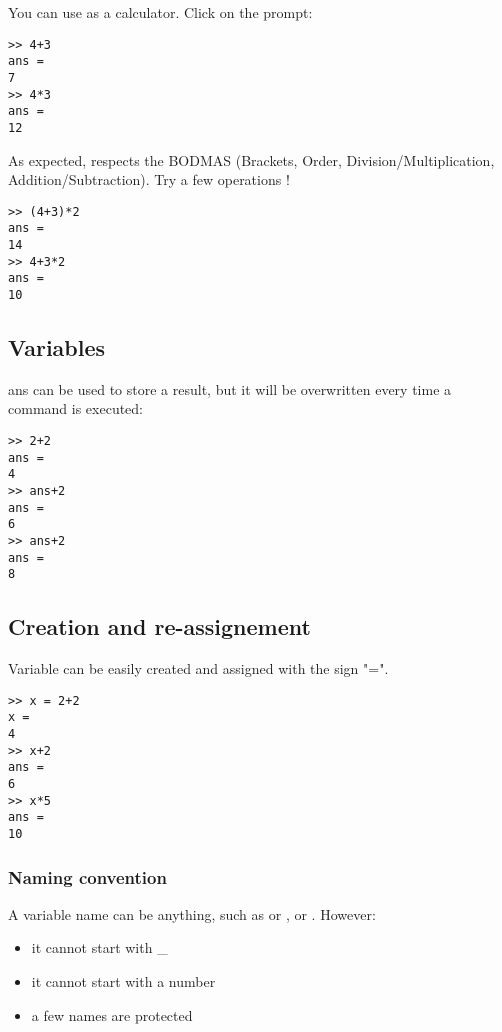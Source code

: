 You can use \matlab as a calculator. 
Click on the prompt: 

\begin{lstlisting}
>> 4+3
ans =
7
>> 4*3
ans =
12
\end{lstlisting}

As expected, \matlab respects the BODMAS (Brackets, Order, Division/Multiplication, Addition/Subtraction). 
Try a few operations !
\begin{lstlisting}
>> (4+3)*2
ans =
14
>> 4+3*2
ans =
10
\end{lstlisting}

\subsection{Variables}
ans can be used to store a result, but it will be overwritten every time a command is executed:

\begin{lstlisting}
>> 2+2
ans =
4
>> ans+2
ans =
6
>> ans+2
ans =
8
\end{lstlisting}

\subsection{Creation and re-assignement}

Variable can be easily created and assigned with the sign "=". 


\begin{lstlisting}
>> x = 2+2
x =
4
>> x+2
ans =
6
>> x*5
ans =
10
\end{lstlisting}


\subsubsection{Naming convention}
A variable name can be anything, such as  or  , or   .
However:
\begin{itemize}
	\item it cannot start with \_
	\item it cannot start with a number
	\item a few names are protected
\end{itemize}

